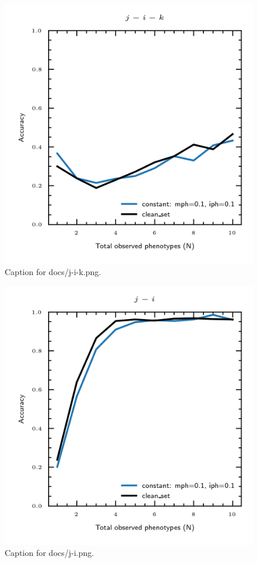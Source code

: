 \documentclass{article}
\begin{document}
\begin{figure}[h] \centering \includegraphics{docs/j-i-k.png} \caption{Caption for docs/j-i-k.png.} \end{figure}
\begin{figure}[h] \centering \includegraphics{docs/j-i.png} \caption{Caption for docs/j-i.png.} \end{figure}
\end{document}
